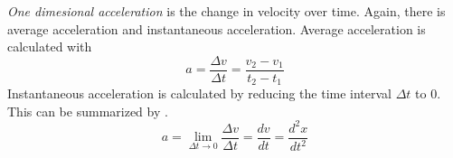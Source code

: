 \documentclass[10pt,letterpaper,final,twoside,notitlepage]{article}
\begin{document}
\begin{definition}[Acceleration] \label{def:1D Acceleration}
  \emph{One dimesional acceleration} is the change in velocity over time.
  Again, there is average acceleration and instantaneous acceleration.
  Average acceleration is calculated with 
  \begin{equation} \label{eq:1D Average Acceleration}
    a = \frac{\Delta v}{\Delta t} = \frac{v_{2} - v_{1}}{t_{2} - t_{1}}
  \end{equation}
  Instantaneous acceleration is calculated by reducing the time interval $\Delta t$ to 0.
  This can be summarized by .
  \begin{equation} \label{eq:1D Instantaneous Acceleration}
    a = \lim\limits_{\Delta t \rightarrow 0} \frac{\Delta v}{\Delta t} = \frac{dv}{dt} = \frac{d^{2}x}{dt^{2}}
  \end{equation}
\end{definition}
    
\end{document}
